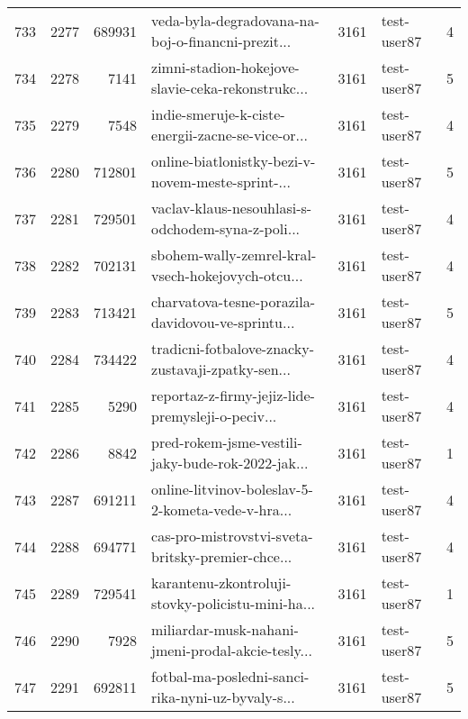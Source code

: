 \begin{tabular}{lrrlrlr}
733  &       2277 &   689931 &  veda-byla-degradovana-na-boj-o-financni-prezit... &     3161 &                  test-user87 &               4 \\
734  &       2278 &     7141 &  zimni-stadion-hokejove-slavie-ceka-rekonstrukc... &     3161 &                  test-user87 &               5 \\
735  &       2279 &     7548 &  indie-smeruje-k-ciste-energii-zacne-se-vice-or... &     3161 &                  test-user87 &               4 \\
736  &       2280 &   712801 &  online-biatlonistky-bezi-v-novem-meste-sprint-... &     3161 &                  test-user87 &               5 \\
737  &       2281 &   729501 &  vaclav-klaus-nesouhlasi-s-odchodem-syna-z-poli... &     3161 &                  test-user87 &               4 \\
738  &       2282 &   702131 &  sbohem-wally-zemrel-kral-vsech-hokejovych-otcu... &     3161 &                  test-user87 &               4 \\
739  &       2283 &   713421 &  charvatova-tesne-porazila-davidovou-ve-sprintu... &     3161 &                  test-user87 &               5 \\
740  &       2284 &   734422 &  tradicni-fotbalove-znacky-zustavaji-zpatky-sen... &     3161 &                  test-user87 &               4 \\
741  &       2285 &     5290 &  reportaz-z-firmy-jejiz-lide-premysleji-o-peciv... &     3161 &                  test-user87 &               4 \\
742  &       2286 &     8842 &  pred-rokem-jsme-vestili-jaky-bude-rok-2022-jak... &     3161 &                  test-user87 &               1 \\
743  &       2287 &   691211 &  online-litvinov-boleslav-5-2-kometa-vede-v-hra... &     3161 &                  test-user87 &               4 \\
744  &       2288 &   694771 &  cas-pro-mistrovstvi-sveta-britsky-premier-chce... &     3161 &                  test-user87 &               4 \\
745  &       2289 &   729541 &  karantenu-zkontroluji-stovky-policistu-mini-ha... &     3161 &                  test-user87 &               1 \\
746  &       2290 &     7928 &  miliardar-musk-nahani-jmeni-prodal-akcie-tesly... &     3161 &                  test-user87 &               5 \\
747  &       2291 &   692811 &  fotbal-ma-posledni-sanci-rika-nyni-uz-byvaly-s... &     3161 &                  test-user87 &               5 \\

\end{tabular}
